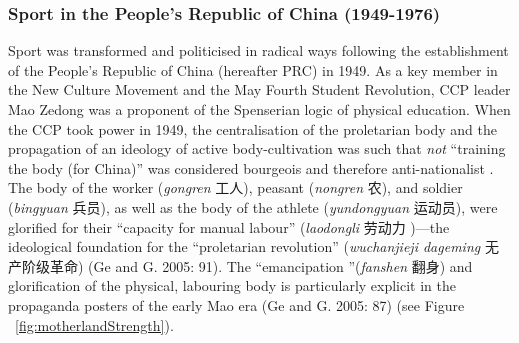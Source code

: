   \subsubsection{Sport in the People's Republic of China (1949-1976)}
  Sport was transformed and politicised in radical ways following the establishment of the People’s Republic of China (hereafter PRC) in 1949.  As a key member in the New Culture Movement and the May Fourth Student Revolution, CCP leader Mao Zedong was a proponent of the Spenserian logic of physical education.   When the CCP took power in 1949, the centralisation of the proletarian body and the propagation of an ideology of active body-cultivation was such that \textit{not} ``training the body (for China)'' was considered bourgeois and therefore anti-nationalist \citep[58]{Brownell1995}.  The body of the worker (\textit{gongren} 工人), peasant (\textit{nongren} 农), and soldier (\textit{bingyuan} 兵员), as well as the body of the athlete (\textit{yundongyuan} 运动员), were glorified for their ``capacity for manual labour'' (\textit{laodongli} 劳动力 )---the ideological foundation for the ``proletarian revolution'' (\textit{wuchanjieji dageming} 无产阶级革命) (Ge and G. 2005: 91).  The ``emancipation ''(\textit{fanshen} 翻身) and glorification of the physical, labouring body is particularly explicit in the propaganda posters of the early Mao era (Ge and G. 2005: 87) (see Figure ~\ref{fig:motherlandStrength}).


